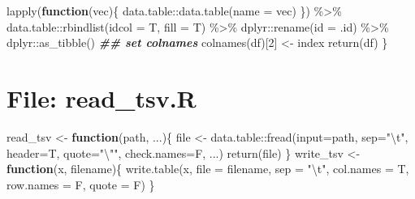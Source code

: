 \documentclass[
]{article}
\newenvironment{Shaded}{\begin{snugshade}}{\end{snugshade}}
\newcommand{\AttributeTok}[1]{\textcolor[rgb]{0.77,0.63,0.00}{#1}}
\newcommand{\ControlFlowTok}[1]{\textcolor[rgb]{0.13,0.29,0.53}{\textbf{#1}}}
\newcommand{\DecValTok}[1]{\textcolor[rgb]{0.00,0.00,0.81}{#1}}
\newcommand{\DocumentationTok}[1]{\textcolor[rgb]{0.56,0.35,0.01}{\textbf{\textit{#1}}}}
\newcommand{\FunctionTok}[1]{\textcolor[rgb]{0.00,0.00,0.00}{#1}}
\newcommand{\NormalTok}[1]{#1}
\newcommand{\OtherTok}[1]{\textcolor[rgb]{0.56,0.35,0.01}{#1}}
\newcommand{\SpecialCharTok}[1]{\textcolor[rgb]{0.00,0.00,0.00}{#1}}
\newcommand{\StringTok}[1]{\textcolor[rgb]{0.31,0.60,0.02}{#1}}
\begin{document}
\begin{Shaded}
\begin{Highlighting}[]
      \FunctionTok{lapply}\NormalTok{(}\ControlFlowTok{function}\NormalTok{(vec)\{}
\NormalTok{               data.table}\SpecialCharTok{::}\FunctionTok{data.table}\NormalTok{(}\AttributeTok{name =}\NormalTok{ vec)}
\NormalTok{           \}) }\SpecialCharTok{\%\textgreater{}\%} 
\NormalTok{      data.table}\SpecialCharTok{::}\FunctionTok{rbindlist}\NormalTok{(}\AttributeTok{idcol =}\NormalTok{ T, }\AttributeTok{fill =}\NormalTok{ T) }\SpecialCharTok{\%\textgreater{}\%} 
\NormalTok{      dplyr}\SpecialCharTok{::}\FunctionTok{rename}\NormalTok{(}\AttributeTok{id =}\NormalTok{ .id) }\SpecialCharTok{\%\textgreater{}\%} 
\NormalTok{      dplyr}\SpecialCharTok{::}\FunctionTok{as\_tibble}\NormalTok{()}
    \DocumentationTok{\#\# set colnames}
    \FunctionTok{colnames}\NormalTok{(df)[}\DecValTok{2}\NormalTok{] }\OtherTok{\textless{}{-}}\NormalTok{ index}
    \FunctionTok{return}\NormalTok{(df)}
\NormalTok{  \}}
\end{Highlighting}
\end{Shaded}

\hypertarget{file-read_tsv.r}{%
\section{File: read\_tsv.R}\label{file-read_tsv.r}}

\begin{Shaded}
\begin{Highlighting}[]
\NormalTok{read\_tsv }\OtherTok{\textless{}{-}} \ControlFlowTok{function}\NormalTok{(path, ...)\{}
\NormalTok{  file }\OtherTok{\textless{}{-}}\NormalTok{ data.table}\SpecialCharTok{::}\FunctionTok{fread}\NormalTok{(}\AttributeTok{input=}\NormalTok{path, }\AttributeTok{sep=}\StringTok{"}\SpecialCharTok{\textbackslash{}t}\StringTok{"}\NormalTok{, }\AttributeTok{header=}\NormalTok{T, }\AttributeTok{quote=}\StringTok{"}\SpecialCharTok{\textbackslash{}"}\StringTok{"}\NormalTok{, }\AttributeTok{check.names=}\NormalTok{F, ...)}
  \FunctionTok{return}\NormalTok{(file)}
\NormalTok{\}}
\NormalTok{write\_tsv }\OtherTok{\textless{}{-}}
  \ControlFlowTok{function}\NormalTok{(x, filename)\{}
    \FunctionTok{write.table}\NormalTok{(x, }\AttributeTok{file =}\NormalTok{ filename, }\AttributeTok{sep =} \StringTok{"}\SpecialCharTok{\textbackslash{}t}\StringTok{"}\NormalTok{, }\AttributeTok{col.names =}\NormalTok{ T, }\AttributeTok{row.names =}\NormalTok{ F, }\AttributeTok{quote =}\NormalTok{ F)}
\NormalTok{  \}}
\end{Highlighting}
\end{Shaded}
\end{document}
